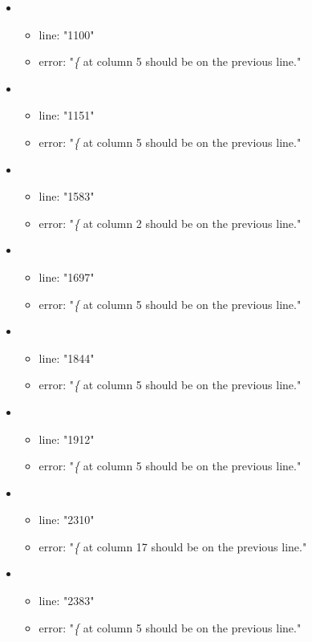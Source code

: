 \begin{itemize}
\begin{itemize}
	\end{itemize}
	\item 
	\begin{itemize} 
		\item line: "1100" 
		\item error: "\emph{\{} at column 5 should be on the previous line." 
	\end{itemize}
	\item 
	\begin{itemize} 
		\item line: "1151" 
		\item error: "\emph{\{} at column 5 should be on the previous line." 
	\end{itemize}
	\item 
	\begin{itemize} 
		\item line: "1583" 
		\item error: "\emph{\{} at column 2 should be on the previous line." 
	\end{itemize}
	\item 
	\begin{itemize} 
		\item line: "1697" 
		\item error: "\emph{\{} at column 5 should be on the previous line." 
	\end{itemize}
	\item 
	\begin{itemize} 
		\item line: "1844" 
		\item error: "\emph{\{} at column 5 should be on the previous line." 
	\end{itemize}
	\item 
	\begin{itemize} 
		\item line: "1912" 
		\item error: "\emph{\{} at column 5 should be on the previous line." 
	\end{itemize}
	\item 
	\begin{itemize} 
		\item line: "2310" 
		\item error: "\emph{\{} at column 17 should be on the previous line." 
	\end{itemize}
	\item 
	\begin{itemize} 
		\item line: "2383" 
		\item error: "\emph{\{} at column 5 should be on the previous line." 

\end{itemize}
\end{itemize}
